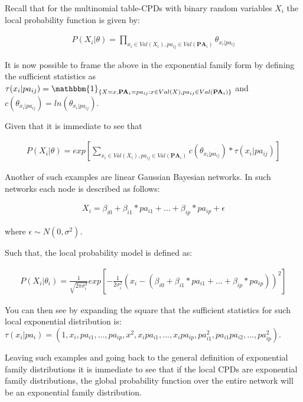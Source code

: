\documentclass[11pt]{article}
\begin{document}
\begin{article}
Recall that for the multinomial table-CPDs with binary random variables \(X_i\) the
local probability function is given by:

\begin{align} \label{eq:multinomial-cpd}
P(X_i|\theta) = \prod_{x_i \in Val(X_i), pa_{ij} \in Val(\textbf{PA}_i)} \theta_{x_i | pa_{ij}}
\end{align}

It is now possible to frame the above in the exponential family form by
defining the sufficient statistics as \(\tau(x_i | pa_{ij}) =
  \mathbbm{1}_{\{X = x, \textbf{PA}_i = pa_{ij} : x \in Val(X), pa_{ij} \in
  Val(\textbf{PA}_i)\}}\) and \(c(\theta_{x_i | pa_{ij}}) = ln(\theta_{x_i |
  pa_{ij}})\).

Given that it is immediate to see that

\begin{align} \label{eq:multinomial-cpd}
P(X_i|\theta) = exp[\sum_{x_i \in Val(X_i), pa_{ij} \in Val(\textbf{PA}_i)} c(\theta_{x_i | pa_{ij}}) * \tau(x_i | pa_{ij})] 
\end{align}

Another of such examples are linear Gaussian Bayesian networks. In
such networks each node is described as follows:

\begin{align} \label{eq:local-prob-model}
X_i = \beta_{i0} + \beta_{i1} * pa_{i1} + ... + \beta_{ip} * pa_{ip} + \epsilon
\end{align}

where \(\epsilon \sim N(0,\sigma^2)\).

Such that, the local probability model is defined as:

\begin{align} \label{eq:gaussian-cpd}
P(X_i|\theta_i) = \frac{1}{\sqrt{2\pi\sigma_i^2}} exp[-\frac{1}{2\sigma_i^2} (x_i - (\beta_{i0} + \beta_{i1} * pa_{i1} + ... + \beta_{ip} * pa_{ip}))^2] 
\end{align}

You can then see by expanding the square that the sufficient
statistics for such local exponential distribution is: \(\tau(x_i|pa_i) =
  (1,x_i,pa_{i1}, ..., pa_{ip}, x^2, x_ipa_{i1}, . . . , x_ipa_{ip}, pa_{i1}^2, pa_{i1}pa_{i2},
  . . . , pa_{ip}^2)\).

Leaving such examples and going back to the general definition of
exponential family distributions it is immediate to see that if
the local CPDs are exponential family distributions, the global
probability function over the entire network will be an
exponential family distribution.


\end{article}
\end{document}
